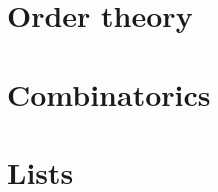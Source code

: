\documentclass[numbers=endperiod, bibliography=totocnumbered, oneside]{scrbook}
\begin{document}
\chapter{Order theory}\label{ch:order_theory}



\chapter{Combinatorics}\label{ch:combinatorics}


\chapter{Lists}

\listofaoc\label{list:aoc}
\listoflem\label{list:lem}
\listofusc\label{list:usc}

\RaggedRight
\printbibliography
\end{document}
